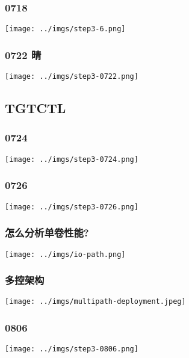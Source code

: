 \documentclass[UTF8,8pt,xcolor=dvipsnames]{beamer}
\begin{document}
\begin{frame}[fragile]
    \frametitle{0718}
    \begin{center}
        \texttt{[image: ../imgs/step3-6.png]}
    \end{center}
\end{frame}

\begin{frame}[fragile]
    \frametitle{0722 晴}
    \begin{center}
        \texttt{[image: ../imgs/step3-0722.png]}
    \end{center}
\end{frame}

\subsection{TGTCTL}

\begin{frame}[fragile]
    \frametitle{0724}
    \begin{center}
        \texttt{[image: ../imgs/step3-0724.png]}
    \end{center}
\end{frame}

\begin{frame}[fragile]
    \frametitle{0726}
    \begin{center}
        \texttt{[image: ../imgs/step3-0726.png]}
    \end{center}
\end{frame}

\begin{frame}[fragile]
    \frametitle{怎么分析单卷性能?}
    \begin{center}
        \texttt{[image: ../imgs/io-path.png]}
    \end{center}
\end{frame}

\begin{frame}[fragile]
    \frametitle{多控架构}
    \begin{center}
        \texttt{[image: ../imgs/multipath-deployment.jpeg]}
    \end{center}
\end{frame}

\begin{frame}[fragile]
    \frametitle{0806}
    \begin{center}
        \texttt{[image: ../imgs/step3-0806.png]}
    \end{center}
\end{frame}
\end{document}

